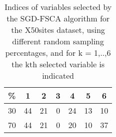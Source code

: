 \begin{table}
	\begin{center}
		\begin{tabular}{c c c c c c c}
			\% & 1 & 2 & 3 & 4 & 5 & 6 \\
			\hline
			30 & 44 & 21 & 0 & 24 & 13 & 10 \\
			70 & 44 & 21 & 0 & 20 & 10 & 37 \\
		\end{tabular}
	\end{center}
	\caption{Indices of variables selected by the SGD-FSCA algorithm for the X50sites dataset, using different random sampling percentages, and for k = 1,..,6 the kth selected variable is indicated}
\end{table}